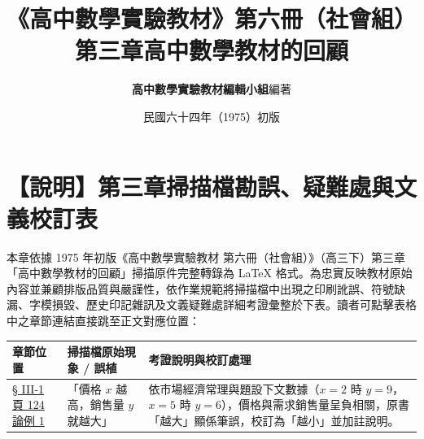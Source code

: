 \documentclass[a4paper,12pt,twoside]{article}
\title{\LARGE\textbf{《高中數學實驗教材》第六冊（社會組）}\\[0.5em] \Large\textbf{第三章\quad 高中數學教材的回顧}}
\author{\textbf{高中數學實驗教材編輯小組}\quad 編著}
\date{民國六十四年（1975）初版}
\begin{document}
\maketitle
\thispagestyle{firstpage}

\section*{【說明】第三章掃描檔勘誤、疑難處與文義校訂表}
\label{sec:errata_notes_b6_ch3}
\label{sec:current_errata}

本章依據 1975 年初版《高中數學實驗教材 第六冊（社會組）》（高三下）第三章「高中數學教材的回顧」掃描原件完整轉錄為 \LaTeX{} 格式。為忠實反映教材原始內容並兼顧排版品質與嚴謹性，依作業規範將掃描檔中出現之印刷訛誤、符號缺漏、字模損毀、歷史印記雜訊及文義疑難處詳細考證彙整於下表。讀者可點擊表格中之章節連結直接跳至正文對應位置：

\begin{table}[H]
\centering
\small
\renewcommand{\arraystretch}{1.35}
\begin{tabularx}{\textwidth}{|p{3.2cm}|p{3.8cm}|X|}
\hline
\textbf{章節位置} & \textbf{掃描檔原始現象 / 誤植} & \textbf{考證說明與校訂處理} \\ \hline

\hyperref[note:b6s-ch3-p124-sales]{§ III-1 頁 124 論例 1} & 
「價格 $x$ 越高，銷售量 $y$ 就越大」 & 
依市場經濟常理與題設下文數據（$x=2$ 時 $y=9$，$x=5$ 時 $y=6$），價格與需求銷售量呈負相關，原書「越大」顯係筆誤，校訂為「越小」並加註說明。 \\ \hline

\end{tabularx}
\end{table}

\newpage
\renewcommand{\contentsname}{目\qquad 次}
\tableofcontents
\newpage

\setcounter{section}{2}

\end{document}
